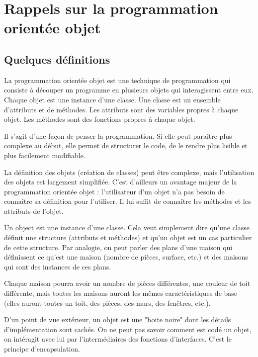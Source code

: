 \section{Rappels sur la programmation orientée objet}
\subsection{Quelques définitions}

La programmation orientée objet est une technique de programmation qui consiste à découper un programme en plusieurs objets qui interagissent entre eux. 
Chaque objet est une instance d'une classe. Une classe est un ensemble d'attributs et de méthodes. Les attributs sont des variables propres à chaque objet. Les méthodes sont des fonctions propres à chaque objet.

Il s'agit d'une façon de penser la programmation. Si elle peut paraître plus complexe au début, elle permet de structurer le code, de le rendre plus lisible et plus facilement modifiable. 

La définition des objets (création de classes) peut être complexe, mais l'utilisation des objets est largement simplifiée. C'est d'ailleurs un avantage majeur de la programmation orientée objet : l'utilisateur d'un objet n'a pas besoin de connaître sa définition pour l'utiliser. Il lui suffit de connaître les méthodes et les attributs de l'objet.


Un object est une instance d'une classe. Cela veut simplement dire qu'une classe définit une structure (attributs et méthodes) et qu'un objet est un cas particulier de cette structure. Par analogie, on peut parler des plans d'une maison qui définissent ce qu'est une maison (nombre de pièces, surface, etc.) et des maisons qui sont des instances de ces plans. 

Chaque maison pourra avoir un nombre de pièces différentes, une couleur de toit différente, mais toutes les maisons auront les mêmes caractéristiques de base (elles auront toutes un toit, des pièces, des murs, des fenêtres, etc.).

\begin{center}
\end{center}


D'un point de vue extérieur, un objet est une "boite noire" dont les détails d'implémentation sont cachés. On ne peut pas savoir comment est codé un objet, on intéragit avec lui par l'intermédiaires des fonctions d'interfaces. C'est le principe d'encapsulation.

